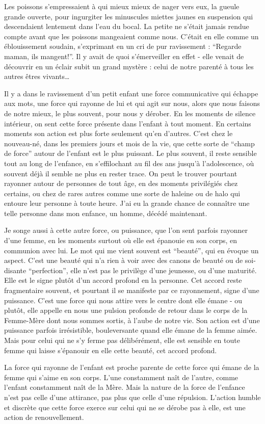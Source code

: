 Les poissons s'empressaient à qui mieux mieux de nager vers eux, la gueule grande ouverte, pour ingurgiter les minuscules miettes jaunes en suspension qui descendaient lentement dans l'eau du bocal. La petite ne s'était jamais rendue compte avant que les poissons mangeaient comme nous. C'était en elle comme un éblouissement soudain, s'exprimant en un cri de pur ravissement : ``Regarde maman, ils mangent!''. Il y avait de quoi s'émerveiller en effet - elle venait de découvrir en un éclair subit un grand mystère : celui de notre parenté à tous les autres êtres vivants\ldots

Il y a dans le ravissement d'un petit enfant une force communicative qui échappe aux mots, une force qui rayonne de lui et qui agit sur nous, alors que nous faisons de notre mieux, le plus souvent, pour nous y dérober. En les moments de silence intérieur, on sent cette force présente dans l'enfant à tout moment. En certains moments son action est plus forte seulement qu'en d'autres. C'est chez le nouveau-né, dans les premiers jours et mois de la vie, que cette sorte de ``champ de force'' autour de l'enfant est le plus puissant. Le plus souvent, il reste sensible tout au long de l'enfance, en s'effilochant au fil des ans jusqu'à l'adolescence, où souvent déjà il semble ne plus en rester trace. On peut le trouver pourtant rayonner autour de personnes de tout âge, en des moments privilégiés chez certains, ou chez de rares autres comme une sorte de haleine ou de halo qui entoure leur personne à toute heure. J'ai eu la grande chance de connaître une telle personne dans mon enfance, un homme, décédé maintenant.

Je songe aussi à cette autre force, ou puissance, que l'on sent parfois rayonner d'une femme, en les moments surtout où elle est épanouie en son corps, en communion avec lui. Le mot qui me vient souvent est ``beauté'', qui en évoque un aspect. C'est une beauté qui n'a rien à voir avec des canons de beauté ou de soi-disante ``perfection'', elle n'est pas le privilège d'une jeunesse, ou d'une maturité. Elle est le signe plutôt d'un accord profond en la personne. Cet accord reste fragmentaire souvent, et pourtant il se manifeste par ce rayonnement, signe d'une puissance. C'est une force qui nous attire vers le centre dont elle émane - ou plutôt, elle appelle en nous une pulsion profonde de retour dans le corps de la Femme-Mère dont nous sommes sortis, à l'aube de notre vie. Son action est d'une puissance parfois irrésistible, bouleversante quand elle émane de la femme aimée. Mais pour celui qui ne s'y ferme pas délibérément, elle est sensible en toute femme qui laisse s'épanouir en elle cette beauté, cet accord profond.

La force qui rayonne de l'enfant est proche parente de cette force qui émane de la femme qui s'aime en son corps. L'une constamment naît de l'autre, comme l'enfant constamment naît de la Mère. Mais la nature de la force de l'enfance n'est pas celle d'une attirance, pas plus que celle d'une répulsion. L'action humble et discrète que cette force exerce sur celui qui ne se dérobe pas à elle, est une action de renouvellement.

